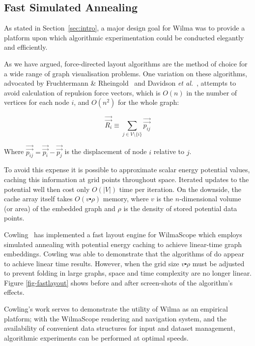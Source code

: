 \documentclass[runningheads]{cl2emult}
\newcommand{\avec}[1]{\vec{\overrightarrow{ #1}}}
\begin{document}
\subsection{Fast Simulated Annealing}

As stated in Section~\ref{sec:intro}, a major design goal for Wilma
was to provide a platform upon which algorithmic experimentation could be
conducted elegantly and efficiently.

As we have argued, force-directed layout algorithms are the method of
choice for a wide range of graph visualisation problems.  One
variation on these algorithms, advocated by Fruchtermann \&
Rheingold~\cite{fruchtermann90force-directed} and Davidson {\em et
al.}~\cite{davidson01noise}, attempts to avoid calculation of
repulsion force vectors, which is $O(n)$ in the number of vertices for
each node $i$, and $O(n^2)$ for the whole graph:

\begin{equation}
\label{repulsion}
\avec{R_i} \equiv \sum_{j \in V \setminus \{i\}} \avec{p_{ij}}
\end{equation}

\noindent Where $\avec{p_{ij}} = \avec{p_i} - \avec{p_j}$ is the displacement
of node $i$ relative to $j$.

To avoid this expense it is possible to approximate scalar energy potential
values, caching this information at grid points throughout space.  Iterated
updates to the potential well then cost only $O(|V|)$ time per iteration.  On
the downside, the cache array itself takes $O(v \centerdot \rho)$ memory,
where $v$ is the $n$-dimensional volume (or area) of the embedded graph and
$\rho$ is the density of stored potential data points.

Cowling~\cite{cowling02fast} has implemented a fast layout engine for
WilmaScope which employs simulated annealing with potential energy caching to
achieve linear-time graph embeddings.  Cowling was able to demonstrate that
the algorithms of \cite{davidson01noise} do appear to achieve linear time
results.  However, when the grid size $v \centerdot \rho$ must be adjusted to
prevent folding in large graphs, space and time complexity are no longer
linear.  Figure \ref{fig-fastlayout} shows before and after screen-shots of
the algorithm's effects.

Cowling's work serves to demonstrate the utility of Wilma as an empirical
platform; with the WilmaScope rendering and navigation system, and the
availability of convenient data structures for input and dataset management,
algorithmic experiments can be performed at optimal speeds.
\end{document}
